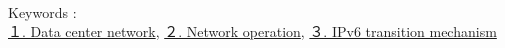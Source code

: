 


~\\ 

Keywords : \\
\underline{１. Data center network},
\underline{２. Network operation},
\underline{３. IPv6 transition mechanism}
\begin{flushright}
\edept \\
\eauthor
\end{flushright}
